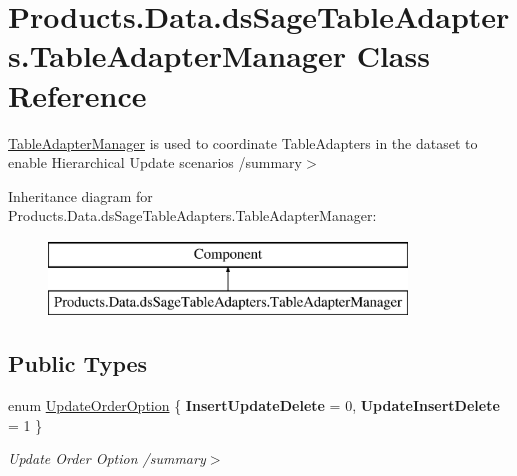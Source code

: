 \hypertarget{class_products_1_1_data_1_1ds_sage_table_adapters_1_1_table_adapter_manager}{}\section{Products.\+Data.\+ds\+Sage\+Table\+Adapters.\+Table\+Adapter\+Manager Class Reference}
\label{class_products_1_1_data_1_1ds_sage_table_adapters_1_1_table_adapter_manager}


\hyperlink{class_products_1_1_data_1_1ds_sage_table_adapters_1_1_table_adapter_manager}{Table\+Adapter\+Manager} is used to coordinate Table\+Adapters in the dataset to enable Hierarchical Update scenarios /summary$>$  


Inheritance diagram for Products.\+Data.\+ds\+Sage\+Table\+Adapters.\+Table\+Adapter\+Manager\+:\begin{figure}[H]
\begin{center}
\leavevmode
\includegraphics[height=2.000000cm]{class_products_1_1_data_1_1ds_sage_table_adapters_1_1_table_adapter_manager}
\end{center}
\end{figure}
\subsection*{Public Types}
\begin{DoxyCompactItemize}
\item 
enum \hyperlink{class_products_1_1_data_1_1ds_sage_table_adapters_1_1_table_adapter_manager_a22342d7fe3c0237165d462a0e1cf0b02}{Update\+Order\+Option} \{ {\bfseries Insert\+Update\+Delete} = 0, 
{\bfseries Update\+Insert\+Delete} = 1
 \}\hypertarget{class_products_1_1_data_1_1ds_sage_table_adapters_1_1_table_adapter_manager_a22342d7fe3c0237165d462a0e1cf0b02}{}\label{class_products_1_1_data_1_1ds_sage_table_adapters_1_1_table_adapter_manager_a22342d7fe3c0237165d462a0e1cf0b02}
\begin{DoxyCompactList}\small\item\em Update Order Option /summary$>$ \end{DoxyCompactList}
\end{DoxyCompactItemize}
